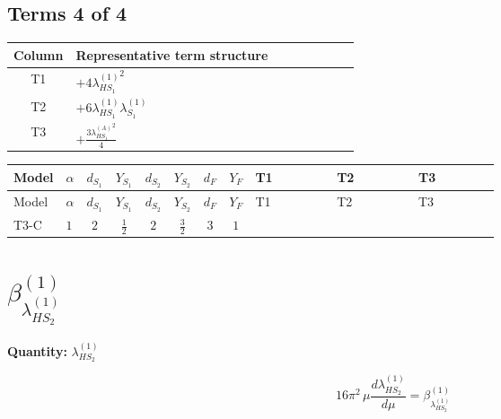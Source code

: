 \documentclass[8pt]{article}
\begin{document}
\begin{landscape}
\subsection*{Terms 4 of 4}
\begin{center}
\begin{tabular}{@{}c >{\raggedright\arraybackslash}p{0.82\linewidth}@{}}
\toprule
Column & Representative term structure \\
\midrule
T1 & \(\displaystyle +4 {\lambda_{HS_1}^{(1)}}^2\) \\
\midrule
T2 & \(\displaystyle +6 {\lambda_{HS_1}^{(1)}} {\lambda_{S_1}^{(1)}}\) \\
\midrule
T3 & \(\displaystyle +\frac{3 {\lambda_{HS_1}^{(A)}}^2}{4}\) \\
\midrule
\bottomrule
\end{tabular}
\end{center}
\smallskip
\tiny
\begin{longtable}{@{}llcccccc >{\raggedright\arraybackslash}p{0.21\linewidth} >{\raggedright\arraybackslash}p{0.21\linewidth} >{\raggedright\arraybackslash}p{0.21\linewidth}@{}}
\toprule
Model & $\alpha$ & $d_{S_1}$ & $Y_{S_1}$ & $d_{S_2}$ & $Y_{S_2}$ & $d_F$ & $Y_F$ & T1 & T2 & T3 \\
\midrule
\endfirsthead
\toprule
Model & $\alpha$ & $d_{S_1}$ & $Y_{S_1}$ & $d_{S_2}$ & $Y_{S_2}$ & $d_F$ & $Y_F$ & T1 & T2 & T3 \\
\midrule
\endhead
T3-C & $1$ & $2$ & $\frac{1}{2}$ & $2$ & $\frac{3}{2}$ & $3$ & $1$ & \scriptsize\adjustbox{max width=\linewidth}{$\begin{gathered} +4 {\lambda_{HS_1}^{(1)}}^2\end{gathered}$} & \scriptsize\adjustbox{max width=\linewidth}{$\begin{gathered} +6 {\lambda_{HS_1}^{(1)}} {\lambda_{S_1}^{(1)}}\end{gathered}$} & \scriptsize\adjustbox{max width=\linewidth}{$\begin{gathered} +\frac{3 {\lambda_{HS_1}^{(A)}}^2}{4}\end{gathered}$} \\
\midrule
\bottomrule
\end{longtable}
\clearpage
\section*{$\beta_{\lambda_{HS_2}^{(1)}}^{(1)}$}
\noindent\textbf{Quantity: }$\lambda_{HS_2}^{(1)}$\par\smallskip
\[16\pi^2\,\mu\frac{d \lambda_{HS_2}^{(1)}}{d\mu}=\beta_{\lambda_{HS_2}^{(1)}}^{(1)}\]

\end{landscape}
\end{document}
